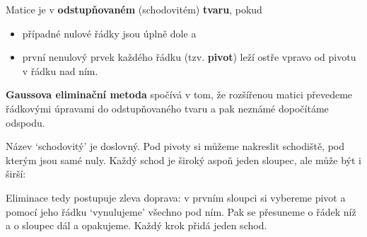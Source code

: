 \begin{definitionbox}
  Matice je v \textbf{odstupňovaném} (schodovitém) \textbf{tvaru}, pokud
  \begin{itemize}
    \item případné nulové řádky jsou úplně dole a
    \item první nenulový prvek každého řádku (tzv. \textbf{pivot}) leží ostře vpravo od pivotu v řádku nad ním.
  \end{itemize}
  \textbf{Gaussova eliminační metoda} spočívá v tom, že rozšířenou matici převedeme řádkovými úpravami do odstupňovaného tvaru a pak neznámé dopočítáme odspodu.
\end{definitionbox}

Název `schodovitý' je doslovný. Pod pivoty si můžeme nakreslit schodiště, pod kterým jsou samé nuly. Každý schod je široký aspoň jeden sloupec, ale může být i širší:
\begin{center}
\end{center}
Eliminace tedy postupuje zleva doprava: v prvním sloupci si vybereme pivot a pomocí jeho řádku `vynulujeme' všechno pod ním. Pak se přesuneme o řádek níž a o sloupec dál a opakujeme. Každý krok přidá jeden schod.

